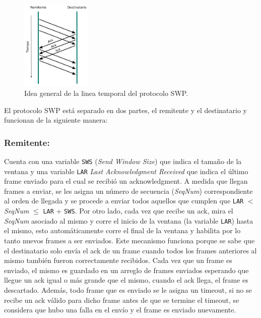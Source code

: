 \documentclass[10pt,a4paper]{article}
\begin{document}
\begin{figure}[!htb]
    \centering
    \includegraphics[width = 0.3\textwidth]{img/png/swp-timeline.png}
    \caption{Idea general de la linea temporal del protocolo SWP.}
    \label{figure: swp timeline}
\end{figure}

El protocolo SWP está separado en dos partes, el remitente y el destinatario y funcionan de la siguiente manera:

\subsubsection{Remitente:}
Cuenta con una variable \texttt{SWS} (\textit{Send Window Size}) que indica el tamaño de la ventana y una variable \texttt{LAR} \textit{Last Acknowledgment Received} que indica el último frame enviado para el cual se recibió un acknowledgment. A medida que llegan frames a enviar, se les asigna un número de secuencia (\textit{SeqNum}) correspondiente al orden de llegada y se procede a enviar todos aquellos que cumplen que \texttt{LAR} $<$ \textit{SeqNum} $\leq$ \texttt{LAR} + \texttt{SWS}. Por otro lado, cada vez que recibe un ack, mira el \textit{SeqNum} asociado al mismo y corre el inicio de la ventana (la variable \texttt{LAR}) hasta el mismo, esto automáticamente corre el final de la ventana y habilita por lo tanto nuevos frames a ser enviados. Este mecanismo funciona porque se sabe que el destinatario solo envía el ack de un frame cuando todos los frames anteriores al mismo también fueron correctamente recibidos. Cada vez que un frame es enviado, el mismo es guardado en un arreglo de frames enviados esperando que llegue un ack igual o más grande que el mismo, cuando el ack llega, el frame es descartado. Además, todo frame que es enviado se le asigna un timeout, si no se recibe un ack válido para dicho frame antes de que se termine el timeout, se considera que hubo una falla en el envío y el frame es enviado nuevamente.
\end{document}
